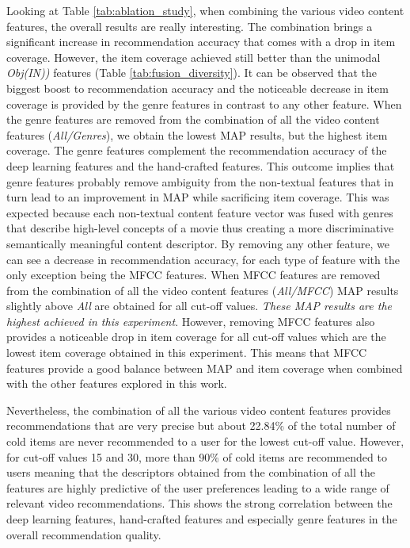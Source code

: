 \documentclass[review]{elsarticle}
\begin{document}
Looking at Table \ref{tab:ablation_study}, when combining the various video content features, the overall results are really interesting. The combination brings a significant increase in recommendation accuracy that comes with a drop in item coverage. However, the item coverage achieved still better than the unimodal \textit{Obj(IN))} features (Table \ref{tab:fusion_diversity}). It can be observed that the biggest boost to recommendation accuracy and the noticeable decrease in item coverage is provided by the genre features in contrast to any other feature. When the genre features are removed from the combination of all the video content features (\textit{All/Genres}), we obtain the lowest MAP results, but the highest item coverage. The genre features complement the recommendation accuracy of the deep learning features and the hand-crafted features. This outcome implies that genre features probably remove ambiguity from the non-textual features that in turn lead to an improvement in MAP while sacrificing item coverage. This was expected because each non-textual content feature vector was fused with genres that describe high-level concepts of a movie thus creating a more discriminative semantically meaningful content descriptor. By removing any other feature, we can see a decrease in recommendation accuracy, for each type of feature with the only exception being the MFCC features. When MFCC features are removed from the combination of all the video content features (\textit{All/MFCC}) MAP results slightly above \textit{All} are obtained for all cut-off values. \textit{These MAP results are the highest achieved in this experiment}. However, removing MFCC features also provides a noticeable drop in item coverage for all cut-off values which are the lowest item coverage obtained in this experiment. This means that MFCC features provide a good balance between MAP and item coverage when combined with the other features explored in this work.    

Nevertheless, the combination of all the various video content features provides recommendations that are very precise but about 22.84\% of the total number of cold items are never recommended to a user for the lowest cut-off value. However, for cut-off values 15 and 30, more than 90\% of cold items are recommended to users meaning that the descriptors obtained from the combination of all the features are highly predictive of the user preferences leading to a wide range of relevant video recommendations. This shows the strong correlation between the deep learning features, hand-crafted features and especially genre features in the overall recommendation quality. 
\end{document}
